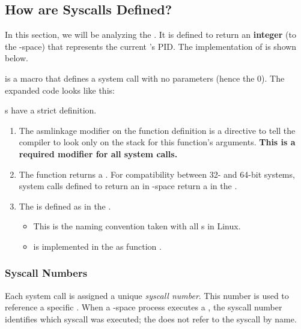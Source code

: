 \subsection{How are Syscalls Defined?}\label{subsec:How_Syscalls_Defined}
In this section, we will be analyzing the  .
It is defined to return an \textbf{integer} (to the -space) that represents the current 's PID.\@
The implementation of  is shown below.

 is a macro that defines a system call with no parameters (hence the 0).
The expanded code looks like this:

s have a strict definition.
\begin{enumerate}[noitemsep]
\item The asmlinkage modifier on the function definition is a directive to tell the compiler to look only on the stack for this function’s arguments.
  \textbf{This is a required modifier for all system calls.}
\item The function returns a .
  For compatibility between 32- and 64-bit systems, system calls defined to return an  in -space return a  in the .
\item The   is defined as  in the .
  \begin{itemize}[noitemsep]
  \item This is the naming convention taken with all s in Linux.
  \item {}  is implemented in the  as function .
  \end{itemize}
\end{enumerate}

\subsubsection{Syscall Numbers}\label{subsubsec:Syscall_Numbers}
\begin{definition}\label{def:Syscall_Number}
  Each system call is assigned a unique \emph{syscall number}.
  This number is used to reference a specific .
  When a -space process executes a , the syscall number identifies which syscall was executed; the  does not refer to the syscall by name.
\end{definition}

